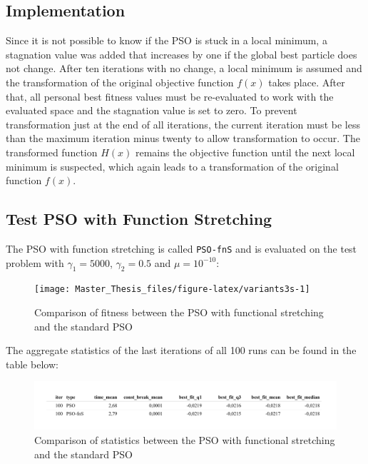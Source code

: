 \documentclass[
  oneside, a4paper, 12pt, openany]{book}
\theoremstyle{definition}
\theoremstyle{definition}
\theoremstyle{definition}
\theoremstyle{definition}
\theoremstyle{remark}
\begin{document}
\hypertarget{implementation}{%
\subsection{Implementation}\label{implementation}}

Since it is not possible to know if the PSO is stuck in a local minimum, a stagnation value was added that increases by one if the global best particle does not change. After ten iterations with no change, a local minimum is assumed and the transformation of the original objective function \(f(x)\) takes place. After that, all personal best fitness values must be re-evaluated to work with the evaluated space and the stagnation value is set to zero. To prevent transformation just at the end of all iterations, the current iteration must be less than the maximum iteration minus twenty to allow transformation to occur. The transformed function \(H(x)\) remains the objective function until the next local minimum is suspected, which again leads to a transformation of the original function \(f(x)\).

\hypertarget{test-pso-with-function-stretching}{%
\subsection{Test PSO with Function Stretching}\label{test-pso-with-function-stretching}}

The PSO with function stretching is called \texttt{PSO-fnS} and is evaluated on the test problem with \(\gamma_1 = 5000\), \(\gamma_2 = 0.5\) and \(\mu = 10^{-10}\):

\begin{figure}[H]
\texttt{[image: Master\_Thesis\_files/figure-latex/variants3s-1]} \caption{Comparison of fitness between the PSO with functional stretching and the standard PSO}\label{fig:variants3s}
\end{figure}

The aggregate statistics of the last iterations of all 100 runs can be found in the table below:

\begin{figure}[H]
\includegraphics{Master_Thesis_files/figure-latex/variants4-1} \caption{Comparison of statistics between the PSO with functional stretching and the standard PSO}\label{fig:variants4}
\end{figure}
\end{document}
